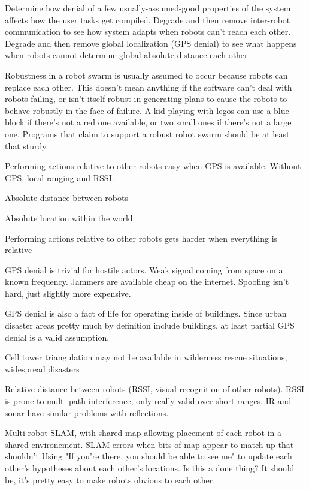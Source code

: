 \documentclass[]{article}
\begin{document}
Determine how denial of a few usually-assumed-good properties of the system affects how the user tasks get compiled. 
Degrade and then remove inter-robot communication to see how system adapts when robots can't reach each other. 
Degrade and then remove global localization (GPS denial) to see what happens when robots cannot determine global absolute distance each other.

Robustness in a robot swarm is usually assumed to occur because robots can replace each other. 
This doesn't mean anything if the software can't deal with robots failing, or isn't itself robust in generating plans to cause the robots to behave robustly in the face of failure. 
A kid playing with legos can use a blue block if there's not a red one available, or two small ones if there's not a large one. 
Programs that claim to support a robust robot swarm should be at least that sturdy.

Performing actions relative to other robots easy when GPS is available. Without GPS, local ranging and RSSI. 

Absolute distance between robots

Absolute location within the world

Performing actions relative to other robots gets harder when everything is relative

GPS denial is trivial for hostile actors. Weak signal coming from space on a known frequency. Jammers are available cheap on the internet. Spoofing isn't hard, just slightly more expensive. 

GPS denial is also a fact of life for operating inside of buildings. Since urban disaster areas pretty much by definition include buildings, at least partial GPS denial is a valid assumption. 

Cell tower triangulation may not be available in wilderness rescue situations, widespread disasters

Relative distance between robots (RSSI, visual recognition of other robots). RSSI is prone to multi-path interference, only really valid over short ranges. IR and sonar have similar problems with reflections. 

Multi-robot SLAM, with shared map allowing placement of each robot in a shared environement. 
SLAM errors when bits of map appear to match up that shouldn't
Using "If you're there, you should be able to see me" to update each other's hypotheses about each other's locations.
Is this a done thing? It should be, it's pretty easy to make robots obvious to each other. 
\end{document}
